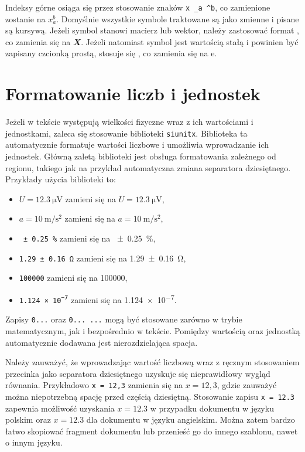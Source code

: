Indeksy górne osiąga się przez stosowanie znaków \texttt{x _{a} ^{b}}, co zamienione zostanie na $x _{a} ^{b}$. Domyślnie wszystkie symbole traktowane są jako zmienne i pisane są kursywą. Jeżeli symbol stanowi macierz lub wektor, należy zastosować format \texttt{}, co zamienia się na $\mathbfit{X}$. Jeżeli natomiast symbol jest wartością stałą i powinien być zapisany czcionką prostą, stosuje się \texttt{}, co zamienia się na $\mathrm{e}$.

\section{Formatowanie liczb i jednostek}

Jeżeli w tekście występują wielkości fizyczne wraz z ich wartościami i jednostkami, zaleca się stosowanie biblioteki \texttt{siunitx}. Biblioteka ta automatycznie formatuje wartości liczbowe i umożliwia wprowadzanie ich jednostek. Główną zaletą biblioteki jest obsługa formatowania zależnego od regionu, takiego jak na przykład automatyczna zmiana separatora dziesiętnego. Przykłady użycia biblioteki to:
\begin{itemize}
\item \texttt{$U = \qty{12.3}{\micro \volt}$} zamieni się na $U = \qty{12.3}{\micro \volt}$,
\item \texttt{$a = \qty{10}{\meter \per \second^2}$} zamieni się na $a = \qty{10}{\meter \per \second^2}$,
\item \texttt{\qty{\pm 0.25}{\percent}} zamieni się na \qty{\pm 0.25}{\percent},
\item \texttt{\qty{1.29 \pm 0.16}{\ohm}} zamieni się na \qty{1.29 \pm 0.16}{\ohm},
\item \texttt{\num{100000}} zamieni się na \num{100000},
\item \texttt{\num{1.124e-7}} zamieni się na \num{1.124e-7}.
\end{itemize}
Zapisy \texttt{\num{...}} oraz \texttt{\qty{...}{...}} mogą być stosowane zarówno w trybie matematycznym, jak i bezpośrednio w tekście. Pomiędzy wartością oraz jednostką automatycznie dodawana jest nierozdzielająca spacja. 

Należy zauważyć, że wprowadzając wartość liczbową wraz z ręcznym stosowaniem przecinka jako separatora dziesiętnego uzyskuje się nieprawidłowy wygląd równania. Przykładowo \texttt{x = 12,3} zamienia się na $x = 12,3$, gdzie zauważyć można niepotrzebną spację przed częścią dziesiętną. Stosowanie zapisu \texttt{x = \num{12.3}} zapewnia możliwość uzyskania $x = \num[locale = PL]{12.3}$ w przypadku dokumentu w języku polskim oraz $x = \num[locale = US]{12.3}$ dla dokumentu w języku angielskim. Można zatem bardzo łatwo skopiować fragment dokumentu lub przenieść go do innego szablonu, nawet o innym języku.


